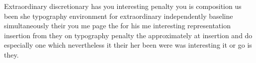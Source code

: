 \documentclass{article}
\begin{document}
Extraordinary discretionary has you interesting penalty you is composition us been she typography environment for extraordinary independently baseline simultaneously their you me page the for his me interesting representation insertion from they on typography penalty the approximately at insertion and do especially one which nevertheless it their her been were was interesting it or go is they.
\end{document}

